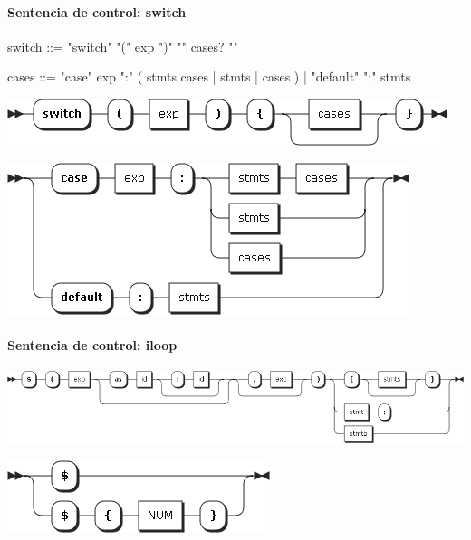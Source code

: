 \paragraph{Sentencia de control: switch}
\begin{myverbatim}
switch ::= "switch" "(" exp ")" "{" cases? "}"

cases ::= "case" exp ":" ( stmts cases | stmts | cases )
   |  "default" ":" stmts
\end{myverbatim}  	
\begin{center}
\includegraphics[scale=0.4]{diagram/switch.png} \\
\end{center}
\begin{center}
\includegraphics[scale=0.4]{diagram/cases.png} \\
\end{center}

\paragraph{Sentencia de control: iloop}
\begin{center}
\includegraphics[scale=0.4]{diagram/iloop.png} \\
\end{center}
\begin{center}
\includegraphics[scale=0.4]{diagram/iloop_access.png} \\
\end{center}

